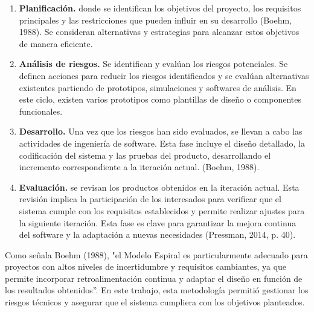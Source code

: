 \begin{enumerate}
  \item \textbf{Planificación.} donde se identifican los objetivos del proyecto, los requisitos principales y las restricciones que pueden influir en su desarrollo (Boehm, 1988). Se consideran alternativas y estrategias para alcanzar estos objetivos de manera eficiente.
  \item \textbf{Análisis de riesgos.} Se identifican y evalúan los riesgos potenciales. Se definen acciones para reducir los riesgos identificados y se evalúan alternativas existentes partiendo de prototipos, simulaciones y softwares de análisis. En este ciclo, existen varios prototipos como plantillas de diseño o componentes funcionales.
  \item \textbf{Desarrollo.} Una vez que los riesgos han sido evaluados, se llevan a cabo las actividades de ingeniería de software. Esta fase incluye el diseño detallado, la codificación del sistema y las pruebas del producto, desarrollando el incremento correspondiente a la iteración actual. (Boehm, 1988).
  \item \textbf{Evaluación.} se revisan los productos obtenidos en la iteración actual. Esta revisión implica la participación de los interesados para verificar que el sistema cumple con los requisitos establecidos y permite realizar ajustes para la siguiente iteración. Esta fase es clave para garantizar la mejora continua del software y la adaptación a nuevas necesidades (Pressman, 2014, p. 40).
\end{enumerate}

Como señala Boehm (1988), "el Modelo Espiral es particularmente adecuado para proyectos con altos niveles de incertidumbre y requisitos cambiantes, ya que permite incorporar retroalimentación continua y adaptar el diseño en función de los resultados obtenidos”. En este trabajo, esta metodología permitió gestionar los riesgos técnicos y asegurar que el sistema cumpliera con los objetivos planteados.

